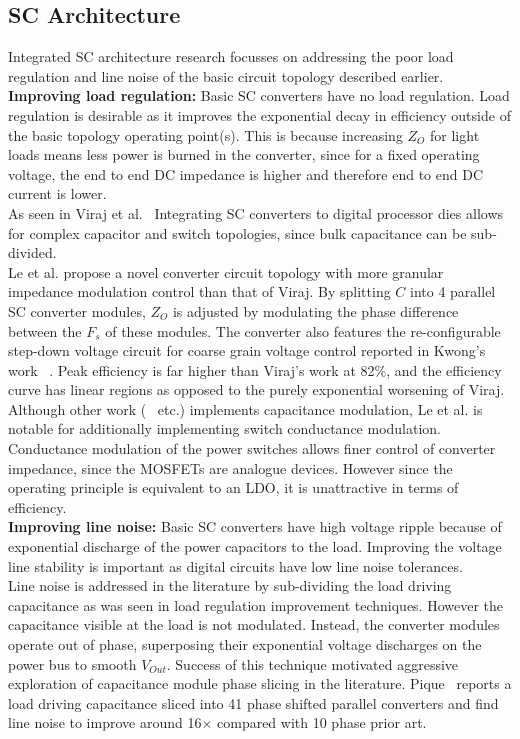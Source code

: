\documentclass[letterpaper,twocolumn,10pt]{article}
\begin{document}
\subsection{SC Architecture}
Integrated SC architecture research focusses on addressing the poor load regulation and line noise of the basic circuit topology described earlier.\\
\textbf{Improving load regulation: }Basic SC converters have no load regulation. Load regulation is desirable as it improves the exponential decay in efficiency outside of the basic topology operating point(s). This is because increasing $Z_O$ for light loads means less power is burned in the converter, since for a fixed operating voltage, the end to end DC impedance is higher and therefore end to end DC current is lower.\\
\indent As seen in  Viraj et al.~\cite{Viraj2007} Integrating SC converters to digital processor dies allows for complex capacitor and switch topologies, since bulk capacitance can be sub-divided.\\
Le et al. \cite{Phuck2010} propose a novel converter circuit topology with more granular impedance modulation control than that of Viraj. By splitting $C$ into 4 parallel SC converter modules, $Z_O$ is adjusted by modulating the phase difference between the $F_s$ of these modules. The converter also features the re-configurable step-down voltage circuit for coarse grain voltage control reported in Kwong's work ~\cite{Kwong2009}. Peak efficiency is far higher than Viraj's work\cite{Viraj2007} at 82\%, and the efficiency curve has linear regions as opposed to the purely exponential worsening of Viraj.\\
Although other work (~\cite{Ramadass2010} etc.) implements capacitance modulation, Le et al. is notable for additionally implementing switch conductance modulation.\\
Conductance modulation of the power switches allows finer control of converter impedance, since the MOSFETs are analogue devices. However since the operating principle is equivalent to an LDO, it is unattractive in terms of efficiency.\\ 
\textbf{Improving line noise: }Basic SC converters have high voltage ripple because of exponential discharge of the power capacitors to the load. Improving the voltage line stability is important as digital circuits have low line noise tolerances.\\ 
Line noise is addressed in the literature by sub-dividing the load driving capacitance as was seen in load regulation improvement techniques. However the capacitance visible at the load is not modulated. Instead, the converter modules operate out of phase, superposing their exponential voltage discharges on the power bus to smooth $V_{Out}$. Success of this technique motivated aggressive exploration of capacitance module phase slicing in the literature. Pique~\cite{Pique2012} reports a load driving capacitance sliced into 41 phase shifted parallel converters and find line noise to improve around 16$\times$ compared with 10 phase prior art.\\ 
\end{document}
